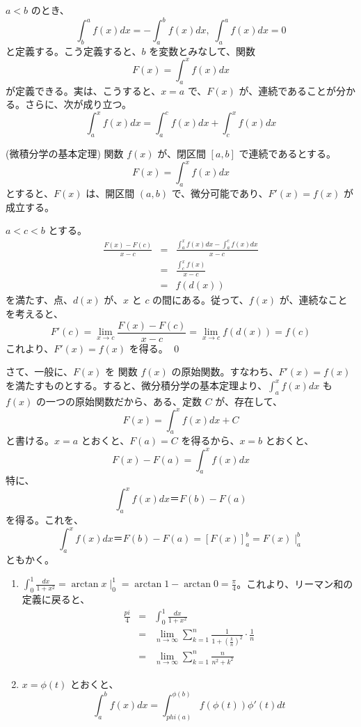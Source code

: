 \medskip
$a < b$ のとき、
$$\int_b^a f(x)dx = -\int_a^b f(x)dx, \; \int_a^a f(x)dx = 0$$
と定義する。こう定義すると、$b$ を変数とみなして、関数
$$F(x) = \int_a^x f(x)dx$$
が定義できる。実は、こうすると、$x = a$ で、$F(x)$ が、連続であることが分かる。さらに、次が成り立つ。
$$\int_a^x f(x)dx = \int_a^c f(x)dx + \int_c^x f(x)dx$$

\begin{thm} {\rm (微積分学の基本定理)}
関数 $f(x)$ が、閉区間 $[a,b]$ で連続であるとする。
$$F(x) = \int_a^x f(x)dx$$
とすると、$F(x)$ は、開区間 $(a,b)$ で、微分可能であり、$F'(x) = f(x)$ が成立する。
\end{thm}
\proof
$a < c < b$ とする。
\begin{eqnarray*}
\frac{F(x) - F(c)}{x-c} & = & \frac{{\displaystyle \int_a^x f(x)dx - \int_a^c f(x)dx}}{x-c}\\
& = & \frac{{\displaystyle \int_c^x f(x)}}{x-c}\\
& = & f(d(x))
\end{eqnarray*}
を満たす、点、$d(x)$ が、$x$ と $c$ の間にある。従って、$f(x)$ が、連続なことを考えると、
$$F'(c) = \lim_{x\to c}\frac{F(x) - F(c)}{x-c} = \lim_{x\to c}f(d(x)) = f(c)$$
これより、$F'(x) = f(x)$ を得る。
\qed

\medskip
さて、一般に、$F(x)$ を 関数 $f(x)$ の原始関数。すなわち、$F'(x) = f(x)$ を満たすものとする。すると、微分積分学の基本定理より、$\int_a^x f(x)dx$ も $f(x)$ の一つの原始関数だから、ある、定数 $C$ が、存在して、
$$F(x) = \int_a^x f(x)dx  + C$$ 
と書ける。$x = a$ とおくと、$F(a) = C$ を得るから、$x = b$ とおくと、
$$F(x) - F(a) = \int_a^x f(x)dx$$
特に、
$$\int_a^x f(x)dx　＝F(b) - F(a)$$
を得る。これを、
$$\int_a^x f(x)dx　＝F(b) - F(a) = [F(x)]_a^b = F(x)\mid^b_a$$
ともかく。

\begin{eg}
\begin{enumerate}
\item ${\displaystyle \int_0^1\frac{dx}{1+x^2} = \arctan x\mid^1_0 = \arctan 1 - \arctan 0 = \frac{\pi}4}$。これより、リーマン和の定義に戻ると、
\begin{eqnarray*}
\frac{pi}4 & = & \int_0^1\frac{dx}{1+x^2}\\
& = &  \lim_{n\to\infty}\sum_{k=1}^n\frac{1}{1+(\frac{k}{n})^2}\cdot\frac{1}{n}\\
& = &  \lim_{n\to\infty}\sum_{k=1}^n\frac{n}{n^2 + k^2}
\end{eqnarray*}
\item $x = \phi(t)$ とおくと、
$$\int_a^bf(x)dx = \int_{phi(a)}^{\phi(b)}f(\phi(t))\phi'(t)dt$$
\end{enumerate}
\end{eg}

